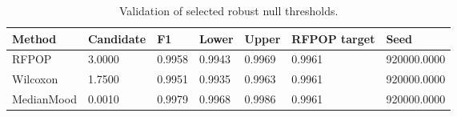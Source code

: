 \begin{table}[ht]
\centering
\caption{Validation of selected robust null thresholds.}
\begin{tabular}{lllllll}
\toprule
Method & Candidate & F1 & Lower & Upper & RFPOP target & Seed
 \\
\midrule
RFPOP & 3.0000 & 0.9958 & 0.9943 & 0.9969 & 0.9961 & 920000.0000 \\
Wilcoxon & 1.7500 & 0.9951 & 0.9935 & 0.9963 & 0.9961 & 920000.0000 \\
MedianMood & 0.0010 & 0.9979 & 0.9968 & 0.9986 & 0.9961 & 920000.0000 \\
\bottomrule
\end{tabular}
\end{table}
